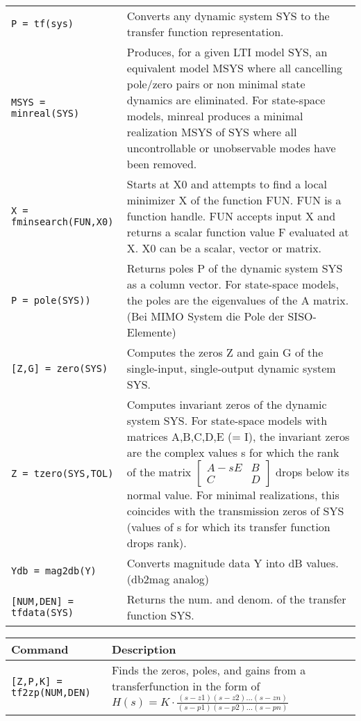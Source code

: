 \begin{center}
{\begin{tabular}{p{5cm}|p{8.5cm}}
        \texttt{P = tf(sys)}  & Converts any dynamic system SYS to the transfer function representation. \\
        
        \texttt{MSYS = minreal(SYS)}  &  Produces, for a given LTI model SYS, an equivalent model MSYS where all cancelling pole/zero pairs or non minimal state dynamics are eliminated.  For state-space models, minreal produces a minimal realization MSYS of SYS where all uncontrollable or unobservable modes have been removed.\\
        
        \texttt{X = fminsearch(FUN,X0)}  &  Starts at X0 and attempts to find a local minimizer X of the function FUN.  FUN is a function handle.  FUN accepts input X and returns a scalar function value F evaluated at X. X0 can be a scalar, vector or matrix.\\
        
        \texttt{P = pole(SYS))}  & Returns poles P of the dynamic system SYS as a column vector. For state-space models, the poles are the eigenvalues of the A matrix. (Bei MIMO System die Pole der SISO-Elemente) \\
        
        \texttt{[Z,G] = zero(SYS)} & Computes the zeros Z and gain G of the single-input, single-output dynamic system SYS.\\
        
        \texttt{Z = tzero(SYS,TOL)}  &  Computes invariant zeros of the dynamic system SYS. For state-space models with matrices A,B,C,D,E (= I), the invariant zeros are the complex values s for which the rank of the matrix $\begin{bmatrix} A -sE & B\\ C & D\end{bmatrix}$ drops below its normal value. For minimal realizations, this coincides with the transmission zeros of SYS (values of s for which its transfer function drops rank).\\ 
        
        \texttt{Ydb = mag2db(Y)} & Converts magnitude data Y into dB values. (db2mag analog)\\
 
        \texttt{[NUM,DEN] = tfdata(SYS)} & Returns the num. and denom. of the transfer function SYS.
        
        
    \end{tabular}

    \begin{tabular}{p{5cm}|p{8.5cm}}
        \textbf{Command}    &   \textbf{Description}\\
        \hline
        \texttt{[Z,P,K] = tf2zp(NUM,DEN)} & Finds the zeros, poles, and gains from a transferfunction in the form of $\displaystyle H(s) = K\cdot\frac{(s-z1)(s-z2)\dots(s-zn)}{(s-p1)(s-p2)\dots(s-pn)}$\\
        

\end{tabular}}
\end{center}

